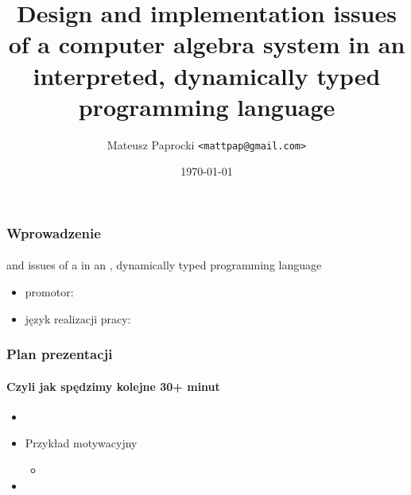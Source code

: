 \documentclass{beamer}
\title{
    Design and implementation issues \linebreak
    of a computer algebra system \linebreak
    in an interpreted, dynamically typed \linebreak
    programming language
}
\author{Mateusz Paprocki \texttt{<mattpap@gmail.com>}}
\institute[PWR]{Wrocław University of Technology}
\date{\today}
\begin{document}
\begin{frame}[plain,t]
    \maketitle
\end{frame}

\begin{frame}
    \frametitle{Wprowadzenie}
    \framesubtitle{}

    \begin{center}
         and  issues \linebreak
        of a  \linebreak
        in an , dynamically typed \linebreak
        programming language
    \end{center}

    \begin{itemize}
        \item promotor: 
        \item język realizacji pracy: 
    \end{itemize}
\end{frame}

\begin{frame}
    \frametitle{Plan prezentacji}
    \framesubtitle{Czyli jak spędzimy kolejne 30+ minut}

    \begin{itemize}
        \item
        \item Przykład motywacyjny
            \begin{itemize}
                \item
            \end{itemize}
        \item
    \end{itemize}
\end{frame}
\end{document}
